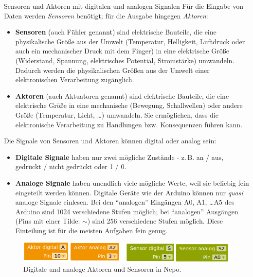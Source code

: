 \bigskip
\begin{zsfg}{Sensoren und Aktoren mit digitalen und analogen Signalen}
	Für die Eingabe von Daten werden \emph{Sensoren} benötigt; für die Ausgabe hingegen \emph{Aktoren}:
	\begin{itemize}[itemsep=0mm,parsep=0mm]
		\item \textbf{Sensoren} (auch Fühler genannt) sind elektrische Bauteile, die eine physikalische Größe aus der Umwelt (Temperatur, Helligkeit, Luftdruck oder auch ein mechanischer Druck mit dem Finger) in eine elektrische Größe (Widerstand, Spannung, elektrisches Potential, Stromstärke) umwandeln. Dadurch werden die physikalischen Größen aus der Umwelt einer elektronischen Verarbeitung zugänglich.
		\item \textbf{Aktoren} (auch Aktuatoren genannt) sind elektrische Bauteile, die eine elektrische Größe in eine mechanische (Bewegung, Schallwellen) oder andere Größe (Temperatur, Licht, \dots) umwandeln. Sie ermöglichen, dass die elektronische Verarbeitung zu Handlungen bzw. Konsequenzen führen kann.
	\end{itemize} 
	
	\medskip
	Die Signale von Sensoren und Aktoren können digital oder analog sein:
	\begin{itemize}[itemsep=0ex, parsep=0ex]
		\item \textbf{Digitale Signale} haben nur zwei mögliche Zustände - z.\,B. an / aus, gedrückt / nicht gedrückt oder 1 / 0.
		\item \textbf{Analoge Signale} haben unendlich viele mögliche Werte, weil sie beliebig fein eingeteilt werden können. Digitale Geräte wie der Arduino können nur \emph{quasi} analoge Signale einlesen. Bei den \enquote{analogen} Eingängen A0, A1, \dots A5 des Arduino sind 1024 verschiedene Stufen möglich; bei \enquote{analogen} Ausgängen (Pins mit einer Tilde: $\sim$) sind 256 verschiedene Stufen möglich. Diese Einteilung ist für die meisten Aufgaben fein genug.
	\end{itemize}
	
	\begin{figure}[H]
		\centering
		\includegraphics[width=0.8\linewidth]{./pics/sensoren-und-aktoren.png}
		\caption{Digitale und analoge Aktoren und Sensoren in Nepo.}
	\end{figure}
\end{zsfg}

